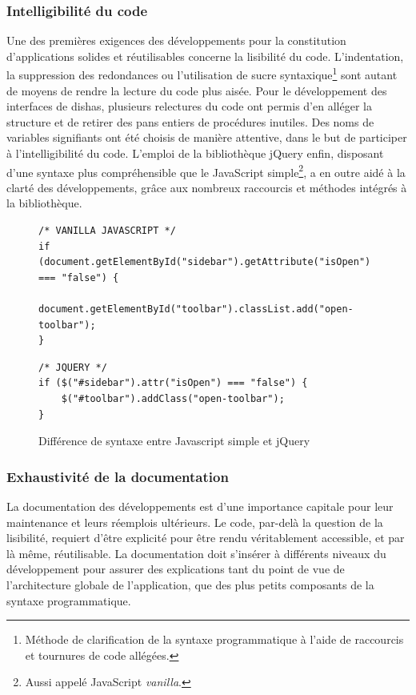 \documentclass[a4paper,12pt,twoside]{book}
\newcommand{\eng}{\emph}
\newcommand{\dishas}{\gls{dishas}\xspace}
\begin{document}
				\subsubsection{Intelligibilité du code}
Une des premières exigences des développements pour la constitution d'applications solides et réutilisables concerne la lisibilité du code. L'indentation, la suppression des redondances ou l'utilisation de sucre syntaxique\footnote{Méthode de clarification de la syntaxe programmatique à l'aide de raccourcis et tournures de code allégées.} sont autant de moyens de rendre la lecture du code plus aisée. Pour le développement des interfaces de \dishas, plusieurs relectures du code ont permis d'en alléger la structure et de retirer des pans entiers de procédures inutiles. Des noms de variables signifiants ont été choisis de manière attentive, dans le but de participer à l'intelligibilité du code. L'emploi de la bibliothèque jQuery enfin, disposant d'une syntaxe plus compréhensible que le JavaScript simple\footnote{Aussi appelé JavaScript \eng{vanilla}.}, a en outre aidé à la clarté des développements, grâce aux nombreux raccourcis et méthodes intégrés à la bibliothèque.

\begin{figure}[H]
\begin{lstlisting}
/* VANILLA JAVASCRIPT */
if (document.getElementById("sidebar").getAttribute("isOpen") === "false") {
        document.getElementById("toolbar").classList.add("open-toolbar");
}
\end{lstlisting}
\begin{lstlisting}
/* JQUERY */
if ($("#sidebar").attr("isOpen") === "false") {
    $("#toolbar").addClass("open-toolbar");
}
\end{lstlisting}
\caption{Différence de syntaxe entre Javascript simple et jQuery}
\end{figure}

				\subsubsection{Exhaustivité de la documentation}
La documentation des développements est d'une importance capitale pour leur maintenance et leurs réemplois ultérieurs. Le code, par-delà la question de la lisibilité, requiert d'être explicité pour être rendu véritablement accessible, et par là même, réutilisable. La documentation doit s'insérer à différents niveaux du développement pour assurer des explications tant du point de vue de l'architecture globale de l'application, que des plus petits composants de la syntaxe programmatique.
\end{document}
